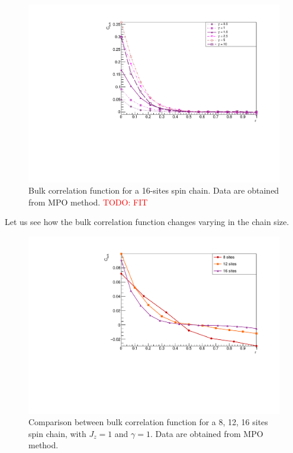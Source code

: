 \begin{figure}[H]
    \centering
    \includegraphics[scale=0.7]{Figures/16sites/16sites_CFBulkCONNVSgamma.pdf}
    \caption{Bulk correlation function for a 16-sites spin chain. Data are obtained from MPO method. \textcolor{red}{TODO: FIT}}
    \label{fig:16sites_CFBulkCONNVSgamma}
\end{figure}

Let us see how the bulk correlation function changes varying in the chain size.

\begin{figure}[H]
    \centering
    \includegraphics[scale=0.7]{Figures/CBulkwConnTermVSsize_J1051.pdf}
    \caption{Comparison between bulk correlation function for a 8, 12, 16 sites spin chain, with $J_z = 1$ and $\gamma = 1$. Data are obtained from MPO method.}
    \label{fig:CBulkwConnTermVSsize_J1051}
\end{figure}

